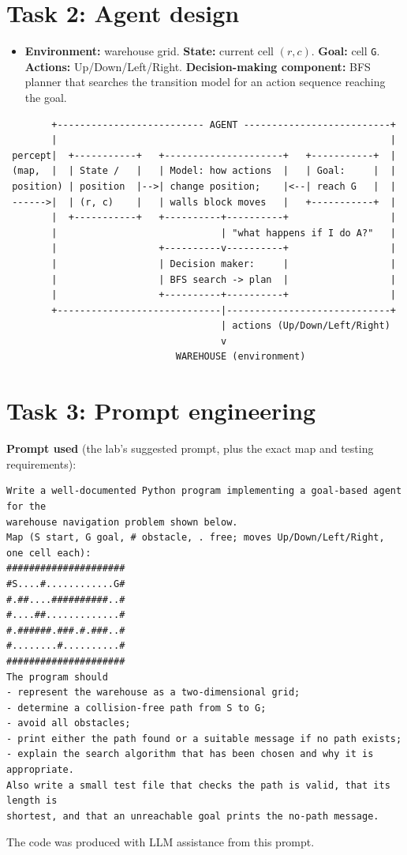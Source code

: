 \documentclass[10pt,a4paper]{article}
\begin{document}
\section*{Task 2: Agent design}
\begin{itemize}[leftmargin=*]
\item \textbf{Environment:} warehouse grid. \textbf{State:} current cell $(r,c)$. \textbf{Goal:} cell \texttt{G}. \textbf{Actions:} Up/Down/Left/Right. \textbf{Decision-making component:} BFS planner that searches the transition model for an action sequence reaching the goal.
\end{itemize}
\begin{Verbatim}
        +-------------------------- AGENT --------------------------+
        |                                                           |
 percept|  +-----------+   +---------------------+   +-----------+  |
 (map,  |  | State /   |   | Model: how actions  |   | Goal:     |  |
 position) | position  |-->| change position;    |<--| reach G   |  |
 ------>|  | (r, c)    |   | walls block moves   |   +-----------+  |
        |  +-----------+   +----------+----------+                  |
        |                             | "what happens if I do A?"   |
        |                  +----------v----------+                  |
        |                  | Decision maker:     |                  |
        |                  | BFS search -> plan  |                  |
        |                  +----------+----------+                  |
        +-----------------------------|-----------------------------+
                                      | actions (Up/Down/Left/Right)
                                      v
                              WAREHOUSE (environment)
\end{Verbatim}

\section*{Task 3: Prompt engineering}
\textbf{Prompt used} (the lab's suggested prompt, plus the exact map and testing requirements):
\begin{Verbatim}
Write a well-documented Python program implementing a goal-based agent for the
warehouse navigation problem shown below.
Map (S start, G goal, # obstacle, . free; moves Up/Down/Left/Right, one cell each):
#####################
#S....#............G#
#.##....##########..#
#....##.............#
#.######.###.#.###..#
#........#..........#
#####################
The program should
- represent the warehouse as a two-dimensional grid;
- determine a collision-free path from S to G;
- avoid all obstacles;
- print either the path found or a suitable message if no path exists;
- explain the search algorithm that has been chosen and why it is appropriate.
Also write a small test file that checks the path is valid, that its length is
shortest, and that an unreachable goal prints the no-path message.
\end{Verbatim}
The code was produced with LLM assistance from this prompt.
\end{document}
